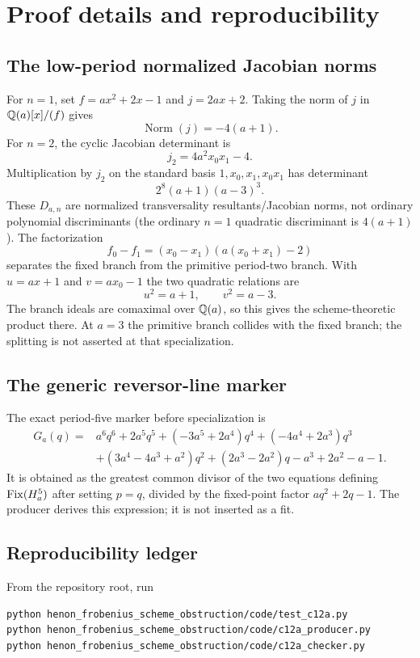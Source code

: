 \section{Proof details and reproducibility}

\subsection{The low-period normalized Jacobian norms}

For $n=1$, set $f=ax^2+2x-1$ and $j=2ax+2$.  Taking the norm of $j$ in
$\mathbb Q(a)[x]/(f)$ gives
\[
 \operatorname{Norm}(j)=-4(a+1).
\]
For $n=2$, the cyclic Jacobian determinant is
\[
 j_2=4a^2x_0x_1-4.
\]
Multiplication by $j_2$ on the standard basis
$1,x_0,x_1,x_0x_1$ has determinant
\[
 2^8(a+1)(a-3)^3.
\]
These $D_{a,n}$ are normalized transversality resultants/Jacobian norms, not
ordinary polynomial discriminants (the ordinary $n=1$ quadratic
discriminant is $4(a+1)$).  The factorization
\[
 f_0-f_1=(x_0-x_1)(a(x_0+x_1)-2)
\]
separates the fixed branch from the primitive period-two branch.  With
$u=ax+1$ and $v=ax_0-1$ the two quadratic relations are
\[
 u^2=a+1,\qquad v^2=a-3.
\]
The branch ideals are comaximal over $\mathbb Q(a)$, so this gives the
scheme-theoretic product there.  At $a=3$ the primitive branch collides with
the fixed branch; the splitting is not asserted at that specialization.

\subsection{The generic reversor-line marker}\label{app:marker}

The exact period-five marker before specialization is
\begin{align*}
G_a(q)={}&a^6q^6+2a^5q^5+(-3a^5+2a^4)q^4
 +(-4a^4+2a^3)q^3\\
&+(3a^4-4a^3+a^2)q^2+(2a^3-2a^2)q
 -a^3+2a^2-a-1.
\end{align*}
It is obtained as the greatest common divisor of the two equations defining
$\operatorname{Fix}(H_a^5)$ after setting $p=q$, divided by the fixed-point factor
$aq^2+2q-1$.  The producer derives this expression; it is not inserted as a
fit.

\subsection{Reproducibility ledger}\label{app:repro}

From the repository root, run
\begin{verbatim}
python henon_frobenius_scheme_obstruction/code/test_c12a.py
python henon_frobenius_scheme_obstruction/code/c12a_producer.py
python henon_frobenius_scheme_obstruction/code/c12a_checker.py
\end{verbatim}

